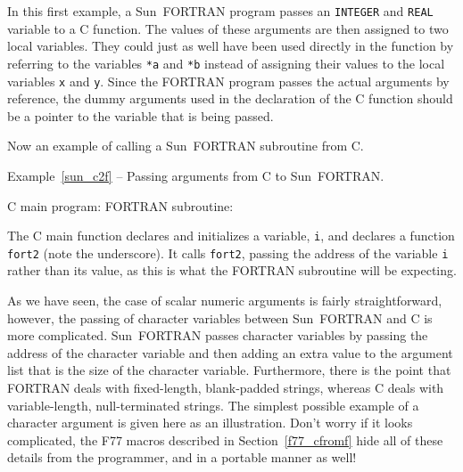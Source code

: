 \documentclass[twoside,11pt]{article}
\newcommand{\htmlref}[2]{#1}
\newcommand{\latex}[1]{#1}
\renewcommand{\_}{\texttt{\symbol{95}}}
\newcounter{examples}
\begin{document}
In this first example, a Sun~FORTRAN program passes an \texttt{INTEGER} and 
\texttt{REAL} variable to a C function. 
The values of these arguments are then assigned to
two local variables. They could just as well have been used directly in the
function by referring to the variables \texttt{*a} and \texttt{*b} instead of 
assigning their values to the local variables \texttt{x} and \texttt{y}. 
Since the FORTRAN program passes the actual arguments by reference, the dummy
arguments used in the declaration of the C function should be a pointer to the
variable that is being passed.

Now an example of calling a Sun~FORTRAN subroutine from C\@.

\label{sun_c2f}
\begin{center}
Example\latex{~\ref{sun_c2f}}
-- Passing arguments from C to Sun~FORTRAN\@.
\end{center}
\nopagebreak[4]
C main program:
\pagebreak[1]
FORTRAN subroutine:

The C main function declares and initializes a variable, \texttt{i}, and declares
a function \texttt{fort2\_} (note the underscore). It calls \texttt{fort2\_}, passing
the address of the variable \texttt{i} rather than its value, as this is what the
FORTRAN subroutine will be expecting.

As we have seen, the case of scalar numeric arguments is fairly
straightforward, however, the passing of character variables between Sun~FORTRAN
and C is more complicated. Sun~FORTRAN passes character variables by passing the
address of the character variable and then adding an extra value to the
argument list that is the size of the character variable.  Furthermore, there
is the point that FORTRAN deals with fixed-length, blank-padded strings,
whereas C deals with variable-length, null-terminated strings. The simplest
possible example of a character argument is given here as an illustration.
Don't worry if it looks complicated, the 
\htmlref{F77 macros }{f77_cfromf}
\latex{described in Section~\ref{f77_cfromf}} hide all
of these details from the programmer, and in a portable manner as well! 
\end{document}
